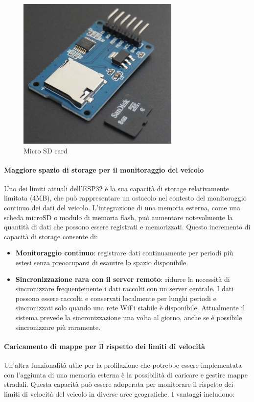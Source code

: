 \documentclass[12pt, a4paper, italian]{report}
\numberwithin{figure}{chapter}
\numberwithin{table}{chapter}
\begin{document}
\begin{figure}[h]
  \centering
  \includegraphics[width=8cm]{MicroSD.png}
  \caption{Micro SD card}
  \label{fig:MicroSD}
\end{figure}

\paragraph{Maggiore spazio di storage per il monitoraggio del veicolo} 
Uno dei limiti attuali dell'ESP32 è la sua capacità di storage relativamente limitata (4MB), che può rappresentare un ostacolo nel contesto del monitoraggio continuo dei dati del veicolo. L'integrazione di una memoria esterna, come una scheda microSD o modulo di memoria flash, può aumentare notevolmente la quantità di dati che possono essere registrati e memorizzati. Questo incremento di capacità di storage consente di:

\begin{itemize}
    \item \textbf{Monitoraggio continuo}: registrare dati continuamente per periodi più estesi senza preoccuparsi di esaurire lo spazio disponibile.
    \item \textbf{Sincronizzazione rara con il server remoto}: ridurre la necessità di sincronizzare frequentemente i dati raccolti con un server centrale. I dati possono essere raccolti e conservati localmente per lunghi periodi e sincronizzati solo quando una rete WiFi stabile è disponibile. Attualmente il sistema prevede la sincronizzazione una volta al giorno, anche se è possibile sincronizzare più raramente.
\end{itemize}

\paragraph{Caricamento di mappe per il rispetto dei limiti di velocità} 
Un'altra funzionalità utile per la profilazione che potrebbe essere implementata con l'aggiunta di una memoria esterna è la possibilità di caricare e gestire mappe stradali. Questa capacità può essere adoperata per monitorare il rispetto dei limiti di velocità del veicolo in diverse aree geografiche. I vantaggi includono:
\end{document}
